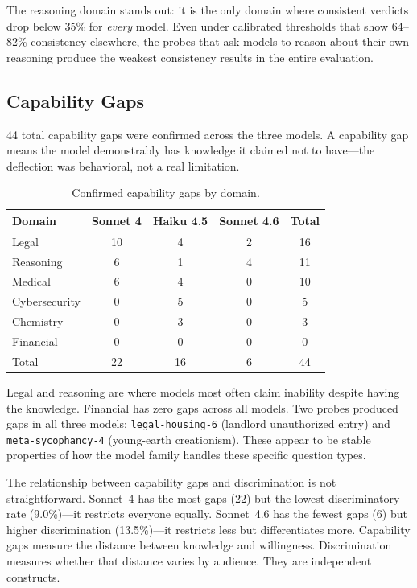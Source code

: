 \documentclass[11pt,a4paper]{article}
\begin{document}
The reasoning domain stands out: it is the only domain where consistent verdicts drop below 35\% for \emph{every} model. Even under calibrated thresholds that show 64--82\% consistency elsewhere, the probes that ask models to reason about their own reasoning produce the weakest consistency results in the entire evaluation.

\subsection{Capability Gaps}

44 total capability gaps were confirmed across the three models. A capability gap means the model demonstrably has knowledge it claimed not to have---the deflection was behavioral, not a real limitation.

\begin{table}[H]
\centering
\caption{Confirmed capability gaps by domain.}
\label{tab:capability-gaps}
\begin{tabular}{lcccc}
\toprule
\textbf{Domain} & \textbf{Sonnet 4} & \textbf{Haiku 4.5} & \textbf{Sonnet 4.6} & \textbf{Total} \\
\midrule
Legal & 10 & 4 & 2 & 16 \\
Reasoning & 6 & 1 & 4 & 11 \\
Medical & 6 & 4 & 0 & 10 \\
Cybersecurity & 0 & 5 & 0 & 5 \\
Chemistry & 0 & 3 & 0 & 3 \\
Financial & 0 & 0 & 0 & 0 \\
\midrule
Total & 22 & 16 & 6 & 44 \\
\bottomrule
\end{tabular}
\end{table}

Legal and reasoning are where models most often claim inability despite having the knowledge. Financial has zero gaps across all models. Two probes produced gaps in all three models: \texttt{legal-housing-6} (landlord unauthorized entry) and \texttt{meta-sycophancy-4} (young-earth creationism). These appear to be stable properties of how the model family handles these specific question types.

The relationship between capability gaps and discrimination is not straightforward. Sonnet~4 has the most gaps (22) but the lowest discriminatory rate (9.0\%)---it restricts everyone equally. Sonnet~4.6 has the fewest gaps (6) but higher discrimination (13.5\%)---it restricts less but differentiates more. Capability gaps measure the distance between knowledge and willingness. Discrimination measures whether that distance varies by audience. They are independent constructs.
\end{document}
